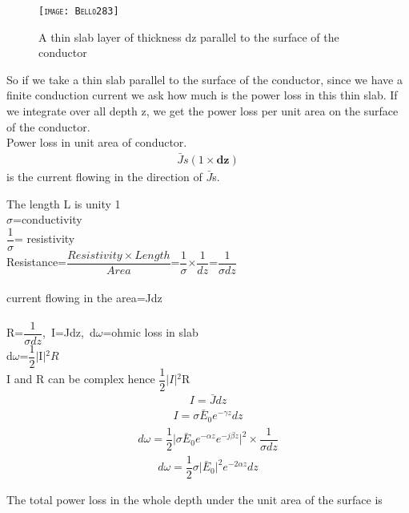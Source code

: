 \begin{figure}
\centering
\textsc{\texttt{[image: Bello283]}}
\caption{A thin slab layer of thickness dz parallel to the surface of the conductor }
\end{figure}
So if we take a thin slab parallel to the surface of the conductor, since we have a finite conduction current we ask how much is the power loss in this thin slab. If we integrate over all depth z, we get the power loss per unit area on the surface of the conductor.\\
Power loss in unit area of conductor.
\begin{align*}
\bar{J}s(1\times\textbf{dz})
\end{align*}
is the current flowing in the direction of  $\bar{J}$s.\\
\begin{center}
The length L is unity 1\\
$\sigma$=conductivity\\
$\dfrac{1}{\sigma}$= resistivity\\
Resistance=$\dfrac{Resistivity \times Length}{Area}$=$\dfrac{1}{\sigma}$$\times$$\dfrac{1}{dz}$=$\dfrac{1}{\sigma dz}$\\\\
current flowing in the area=Jdz\\\\
R=$\dfrac{1}{\sigma dz}$,\ I=Jdz,\ d$\omega$=ohmic loss in slab\\
d$\omega$=$\dfrac{1}{2}$$\lvert$I$\rvert$$^{2}R$\\
I and R can be complex hence $\dfrac{1}{2}$$\lvert$$I\rvert$$^{2}$R\\
\begin{align*}
I=\bar{J}dz
\end{align*}
\begin{align*}
I=\sigma\bar{E}_{0}\textit{e}^{-\gamma z}dz
\end{align*}
\begin{align*}
d\omega=\dfrac{1}{2}\lvert\sigma\bar{E}_{0}\textit{e}^{-\alpha z}\textit{e}^{-j\beta z}\rvert^{2}\times\dfrac{1}{\sigma dz}
\end{align*}
\begin{align*}
d\omega=\dfrac{1}{2}\sigma\lvert\bar{E}_{0}\rvert^{2}\textit{e}^{-2\alpha z}dz
\end{align*}
\end{center}
\begin{Large}
	The total power loss in the whole depth under the unit area of the surface is
\end{Large}
